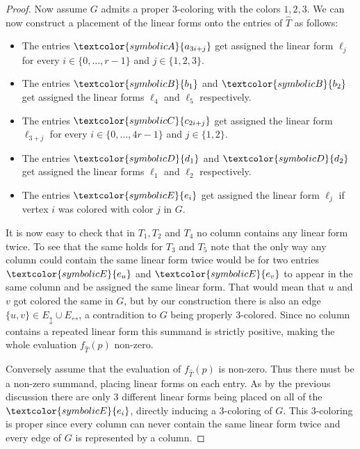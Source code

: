 \documentclass[10pt,a4paper]{article}
\numberwithin{equation}{section}
\theoremstyle{definition}
\newcommand{\Ehor}{{\ensuremath{E_{\leftrightarrow}}}}
\newcommand{\Evert}{{\ensuremath{E_{\updownarrow}}}}
\begin{document}
\begin{proof}
    Now assume $G$ admits a proper $3$-coloring with the colors $1,2,3$.
    We can now construct a placement of the linear forms onto the entries of $\hat{T}$ as follows:
    \begin{itemize}
        \item The entries $\textcolor{symbolicA}{a_{3i+j}}$ get assigned the linear form $\ell_j$ for every $i \in \{0, \ldots, r-1\}$ and $j \in \{1, 2, 3\}$.
        \item The entries $\textcolor{symbolicB}{b_1}$ and $\textcolor{symbolicB}{b_2}$ get assigned the linear forms $\ell_4$ and $\ell_5$ respectively.
        \item The entries $\textcolor{symbolicC}{c_{2i+j}}$ get assigned the linear form $\ell_{3+j}$ for every $i \in \{0, \ldots, 4r-1\}$ and $j \in \{1, 2\}$.
        \item The entries $\textcolor{symbolicD}{d_1}$ and $\textcolor{symbolicD}{d_2}$ get assigned the linear forms $\ell_1$ and $\ell_2$ respectively.
        \item The entries $\textcolor{symbolicE}{e_i}$ get assigned the linear form $\ell_j$ if vertex $i$ was colored with color $j$ in $G$.
    \end{itemize}
    It is now easy to check that in $T_1, T_2$ and $T_4$ no column contains any linear form twice.
    To see that the same holds for $T_3$ and $T_5$ note that the only way any column could contain the same linear form twice would be for two entries $\textcolor{symbolicE}{e_u}$ and $\textcolor{symbolicE}{e_v}$ to appear in the same column and be assigned the same linear form.
    That would mean that $u$ and $v$ got colored the same in $G$, but by our construction there is also an edge $\{u, v\} \in \Evert \cup \Ehor$, a contradition to $G$ being properly $3$-colored.
    Since no column contains a repeated linear form this summand is strictly positive, making the whole evaluation $f_{\hat{T}}(p)$ non-zero.

    Conversely assume that the evaluation of $f_{\hat{T}}(p)$ is non-zero.
    Thus there must be a non-zero summand, placing linear forms on each entry.
    As by the previous discussion there are only $3$ different linear forms being placed on all of the $\textcolor{symbolicE}{e_i}$, directly inducing a $3$-coloring of $G$.
    This $3$-coloring is proper since every column can never contain the same linear form twice and every edge of $G$ is represented by a column.


\end{proof}
\end{document}
